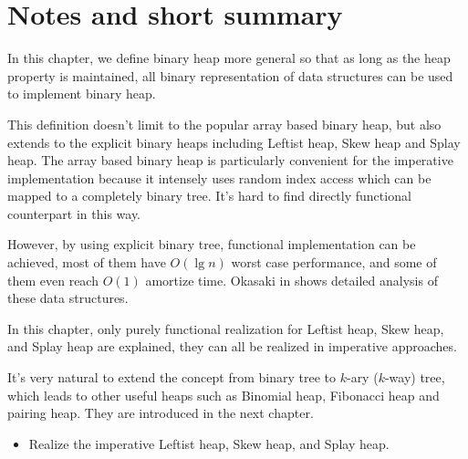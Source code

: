 \documentclass[UTF8]{article}
\begin{document}
\section{Notes and short summary}

In this chapter, we define binary heap more general
so that as long as the heap property is maintained, all binary
representation of data structures can be used to implement binary heap.

This definition doesn't limit to the popular array based binary
heap, but also extends to the explicit binary heaps including Leftist
heap, Skew heap and Splay heap. The array based binary heap
is particularly convenient for the imperative implementation
because it intensely uses random index access which can be mapped to
a completely binary tree. It's hard to find directly functional
counterpart in this way.

However, by using explicit binary tree, functional implementation
can be achieved, most of them have $O(\lg n)$ worst case
performance, and some of them even reach $O(1)$ amortize time.
Okasaki in \cite{okasaki-book} shows detailed analysis of these data
structures.

In this chapter, only purely functional realization for Leftist heap,
Skew heap, and Splay heap are explained, they can all be realized
in imperative approaches.

It's very natural to extend the concept from binary tree to
$k$-ary ($k$-way) tree, which leads to other useful heaps such as
Binomial heap, Fibonacci heap and pairing heap. They are introduced
in the next chapter.

\begin{Exercise}
\begin{itemize}
\item Realize the imperative Leftist heap, Skew heap, and Splay heap.
\end{itemize}
\end{Exercise}
\end{document}
